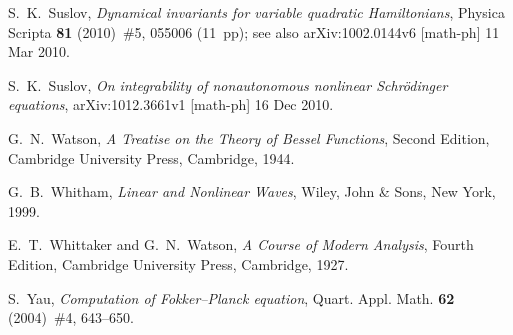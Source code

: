 \documentclass[12pt,reqno]{amsart}
\theoremstyle{plain}
\numberwithin{equation}{section}
\begin{document}
\begin{thebibliography}{99}
 S.~K.~Suslov, \emph{Dynamical invariants for variable
quadratic Hamiltonians\/}, Physica Scripta \textbf{81} (2010)~\#5, 055006
(11~pp); see also arXiv:1002.0144v6 [math-ph] 11 Mar 2010.

 S.~K.~Suslov, \emph{On integrability of nonautonomous
nonlinear Schr\"{o}dinger equations\/}, arXiv:1012.3661v1 [math-ph] 16 Dec
2010.

 G.~N.~Watson, \textsl{A Treatise on the Theory of Bessel
Functions\/}, Second Edition, Cambridge University Press, Cambridge, 1944.

 G.~B.~Whitham, \textsl{Linear and Nonlinear Waves\/},
Wiley, John \& Sons, New York, 1999.

 E.~T.~Whittaker and G.~N.~Watson, \textsl{A Course of Modern
Analysis\/}, Fourth Edition, Cambridge University Press, Cambridge, 1927.

 S.~Yau, \emph{Computation of Fokker--Planck equation\/},
Quart. Appl. Math. \textbf{62} (2004)~\#4, 643--650.
\end{thebibliography}
\end{document}
